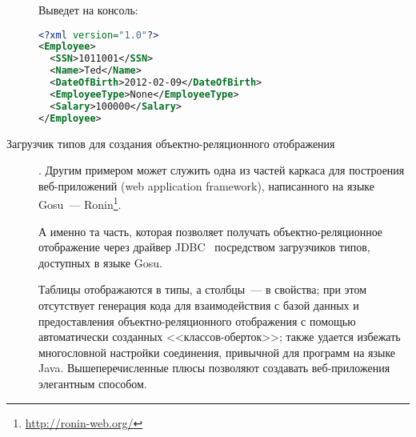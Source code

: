 \begin{description}
\begin{code}
Выведет на консоль:
\begin{lstlisting}[language=xml]
<?xml version="1.0"?>
<Employee>
  <SSN>1011001</SSN>
  <Name>Ted</Name>
  <DateOfBirth>2012-02-09</DateOfBirth>
  <EmployeeType>None</EmployeeType>
  <Salary>100000</Salary>
</Employee>
\end{lstlisting}

\end{code}


\item[Загрузчик типов для создания объектно-реляционного отображения]. Другим примером может служить одна из частей каркаса для построения веб-приложений (web application framework), написанного на языке Gosu~--- Ronin\footnote{\url{http://ronin-web.org/}}.

А именно та часть, которая позволяет получать объектно-реляционное отображение через драйвер JDBC~\cite{jdbc-book} посредством загрузчиков типов, доступных в языке Gosu.

Таблицы отображаются в типы, а столбцы~--- в свойства; при этом отсутствует генерация кода для взаимодействия с базой данных и предоставления объектно-реляционного отображения с помощью автоматически созданных <<классов-оберток>>; также удается избежать многословной настройки соединения, привычной для программ на языке Java.
Вышеперечисленные плюсы позволяют создавать веб-приложения элегантным способом.

\end{description}